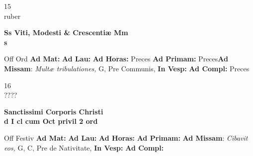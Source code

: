 \documentclass[10pt, openany]{book}
\begin{document}
    \begin{center}
        \begin{minipage}{3.5in}
            \vspace{2em}
            \begin{minipage}{0.5in}
                {\Huge 15} \\
                {\normalsize ruber}
            \end{minipage}
            \begin{minipage}{3.0in}
                \textbf{ \large Ss Viti, Modesti \& Crescentiæ Mm \\
                \textnormal{\normalsize s}}

            \end{minipage}
            \begin{justify}Off Ord
                \textbf{Ad Mat: }
                \textbf{Ad Lau: }
                \textbf{Ad Horas: }Preces
                \textbf{Ad Primam: }Preces\textbf{Ad Missam}: \textit{Multæ tribulationes,} G, Pre Communis, 
                \textbf{In Vesp: }
                \textbf{Ad Compl: }Preces
            \end{justify}
        \end{minipage}
    \end{center}

    \begin{center}
        \begin{minipage}{3.5in}
            \vspace{2em}
            \begin{minipage}{0.5in}
                {\Huge 16} \\
                {\normalsize ????}
            \end{minipage}
            \begin{minipage}{3.0in}
                \textbf{ \large Sanctissimi Corporis Christi \\
                \textnormal{\normalsize d I cl cum Oct privil 2 ord}}

            \end{minipage}
            \begin{justify}Off Festiv
                \textbf{Ad Mat: }
                \textbf{Ad Lau: }
                \textbf{Ad Horas: }
                \textbf{Ad Primam: }\textbf{Ad Missam}: \textit{Cibavit eos,} G, C, Pre de Nativitate, 
                \textbf{In Vesp: }
                \textbf{Ad Compl: }
            \end{justify}
        \end{minipage}
    \end{center}
\end{document}

